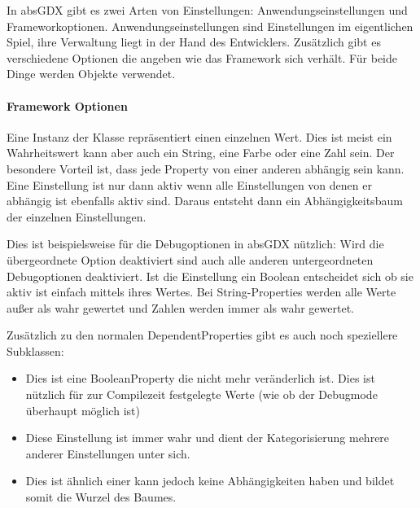 
In absGDX gibt es zwei Arten von Einstellungen: Anwendungseinstellungen und Frameworkoptionen.
Anwendungseinstellungen sind Einstellungen im eigentlichen Spiel, ihre Verwaltung liegt in der Hand des Entwicklers.
Zusätzlich gibt es verschiedene Optionen die angeben wie das Framework sich verhält. Für beide Dinge werden  Objekte verwendet.

\paragraph{Framework Optionen}

Eine Instanz der Klasse  repräsentiert einen einzelnen Wert. Dies ist meist ein Wahrheitswert kann aber auch ein String, eine Farbe oder eine Zahl sein.
Der besondere Vorteil ist, dass jede Property von einer anderen abhängig sein kann. Eine Einstellung ist nur dann aktiv wenn alle Einstellungen von denen er abhängig ist ebenfalls aktiv sind. Daraus entsteht dann ein Abhängigkeitsbaum der einzelnen Einstellungen.


Dies ist beispielsweise für die Debugoptionen in absGDX nützlich: Wird die übergeordnete Option  deaktiviert sind auch alle anderen untergeordneten Debugoptionen deaktiviert. 
Ist die Einstellung ein Boolean entscheidet sich ob sie aktiv ist einfach mittels ihres Wertes. 
Bei String-Properties werden alle Werte außer  als wahr gewertet und Zahlen werden immer als wahr gewertet.

Zusätzlich zu den normalen DependentProperties gibt es auch noch speziellere Subklassen:

\begin{itemize}
\item {} Dies ist eine BooleanProperty die nicht mehr veränderlich ist. Dies ist nützlich für zur Compilezeit festgelegte Werte (wie ob der Debugmode überhaupt möglich ist)
\item {} Diese Einstellung ist immer wahr und dient der Kategorisierung mehrere anderer Einstellungen unter sich.
\item {} Dies ist ähnlich einer  kann jedoch keine Abhängigkeiten haben und bildet somit die Wurzel des Baumes.
\end{itemize}